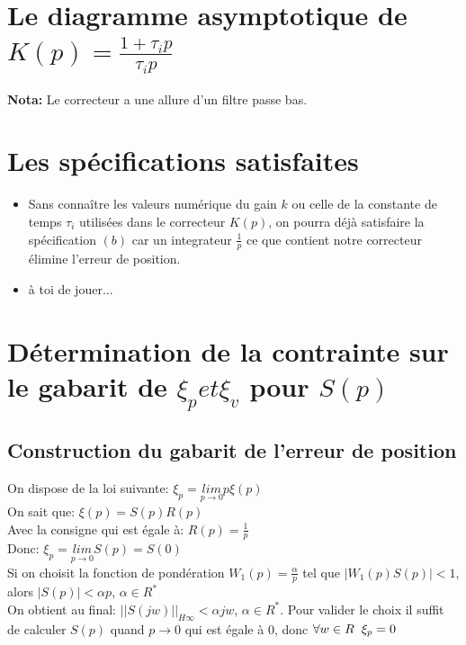 \documentclass[12pt, a4paper, openany]{report}
\begin{document}
 \section{Le diagramme asymptotique de $K(p)=\frac {1+\tau_{i}p}{\tau_{i}p}$} 
 
  \begin{center}
    \label{fig3}
  \end{center}

  \textbf{Nota:} \hspace{2mm} Le correcteur a une allure d'un filtre passe bas.

 \section{Les spécifications satisfaites}
 
  \begin{itemize} [label=,font=\small \color{black}]
  	\item Sans connaître les valeurs numérique du gain $k$ ou celle de la constante de temps $\tau_{i}$ utilisées dans le correcteur $K(p)$, on pourra déjà satisfaire la spécification $(b)$ car un integrateur $\frac{1}{p}$ ce que contient notre correcteur élimine l'erreur de position.
    \item à toi de jouer...
  \end{itemize}
 
 \section{Détermination de la contrainte sur le gabarit de $\xi_{p} et \xi_{v} $ pour $S(p)$}  
 
  \subsection{Construction du gabarit de l'erreur de position}
  
   On dispose de la loi suivante: \hspace{5mm} $\xi_{p}=\underset{p\longrightarrow 0}{lim}  p\xi(p)$\\[0.75cm]
   On sait que: \hspace{5mm} $\xi(p)=S(p)R(p)$\\[0.75cm]
   Avec la consigne qui est égale à: \hspace{5mm} $R(p)=\frac{1}{p}$\\[0.75cm]
   Donc: \hspace{5mm} $\xi_{p}=\underset{p\longrightarrow 0}{lim} S(p)=S(0)$\\[0.75cm]
   Si on choisit la fonction de pondération $W_{1}(p)=\frac{\alpha}{p}$ tel que $|W_{1}(p)S(p)|<1$, alors $|S(p)|<\alpha p$, $\alpha \in R^{*}$ \\[0.75cm]
   On obtient au final: \hspace{5mm} $||S(jw)||_{H\infty}<\alpha jw$, $\alpha \in R^{*}$. Pour valider le choix il suffit de calculer $S(p)$ quand $p\rightarrow0$ qui est égale à $0$, donc $\forall w \in R \hspace{2mm} \xi_{p}=0$ 
   
\end{document}
